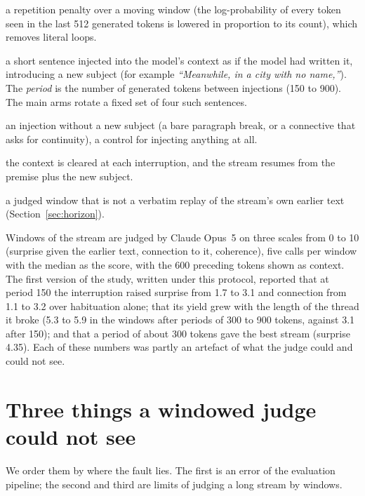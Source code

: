 \documentclass[11pt]{article}
\begin{document}
\begin{description}[leftmargin=1em,itemsep=0.1em,font=\normalfont\itshape]
\item[Habituation:] a repetition penalty over a moving window (the
log-probability of every token seen in the last 512 generated tokens is
lowered in proportion to its count), which removes literal loops.
\item[Interruption:] a short sentence injected into the model's context as
if the model had written it, introducing a new subject (for example
\emph{``Meanwhile, in a city with no name,''}). The \emph{period} is the
number of generated tokens between injections (150 to 900). The main arms
rotate a fixed set of four such sentences.
\item[Sham break:] an injection without a new subject (a bare paragraph
break, or a connective that asks for continuity), a control for injecting
anything at all.
\item[Reset:] the context is cleared at each interruption, and the stream
resumes from the premise plus the new subject.
\item[Fresh window:] a judged window that is not a verbatim replay of the
stream's own earlier text (Section~\ref{sec:horizon}).
\end{description}

Windows of the stream are judged by Claude Opus~5 on three scales from 0 to
10 (surprise given the earlier text, connection to it, coherence), five
calls per window with the median as the score, with the 600 preceding tokens
shown as context. The first version of the study, written under this
protocol, reported that at period 150 the interruption raised surprise from
1.7 to 3.1 and connection from 1.1 to 3.2 over habituation alone; that its
yield grew with the length of the thread it broke (5.3 to 5.9 in the
windows after periods of 300 to 900 tokens, against 3.1 after 150); and that
a period of about 300 tokens gave the best stream (surprise 4.35). Each of
these numbers was partly an artefact of what the judge could and could not
see.

\section{Three things a windowed judge could not see}

We order them by where the fault lies. The first is an error of the
evaluation pipeline; the second and third are limits of judging a long
stream by windows.
\end{document}
